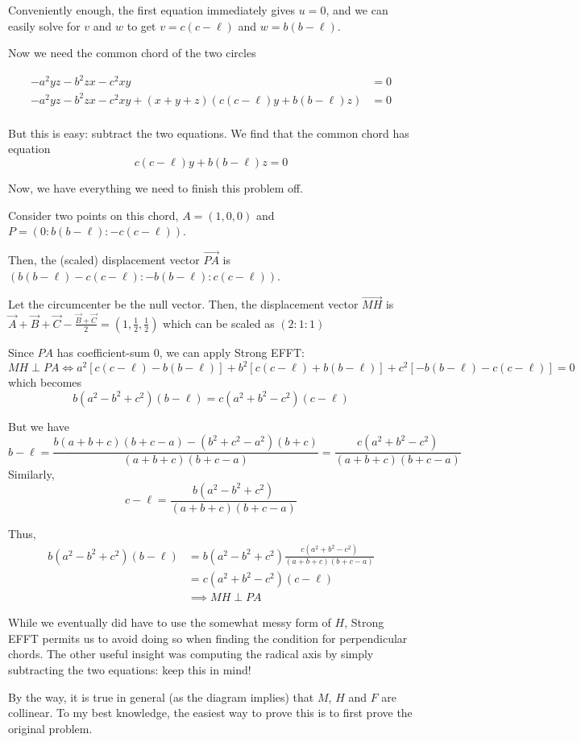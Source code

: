 \begin{soln}
  Conveniently enough, the first equation immediately gives $u=0$, and we can easily solve for $v$ and $w$ to get $v = c(c-\ell)$ and $w=b(b-\ell)$.

  Now we need the common chord of the two circles

  \begin{align*}
     -a^2yz - b^2zx - c^2xy &= 0 \\
     -a^2yz - b^2zx - c^2xy + (x+y+z)(c(c-\ell) y + b(b-\ell) z) &= 0\\
  \end{align*}

  But this is easy: subtract the two equations.  We find that the common chord has equation
  \[ c(c-\ell) y + b(b-\ell) z = 0\]




  Now, we have everything we need to finish this problem off.

  Consider two points on this chord, $A=(1,0,0)$ and $P=(0:b(b-\ell):-c(c-\ell))$.

  Then, the (scaled) displacement vector $\overrightarrow{PA}$ is $(b(b-\ell)-c(c-\ell):-b(b-\ell):c(c-\ell))$.

  Let the circumcenter be the null vector. Then, the displacement vector $\overrightarrow{MH}$ is $\vec A+\vec B + \vec C-\frac{\vec B + \vec C}{2}=\left(1,\frac{1}{2},\frac{1}{2}\right)$ which can be scaled as $(2:1:1)$

  Since $PA$ has coefficient-sum $0$, we can apply Strong EFFT: \[ MH \perp PA \Leftrightarrow a^2[c(c-\ell)-b(b-\ell)]+b^2[c(c-\ell)+b(b-\ell)]+c^2[-b(b-\ell)-c(c-\ell)] =0 \] which becomes  \[ b(a^2-b^2+c^2)(b-\ell)=c(a^2+b^2-c^2)(c-\ell) \]

  But we have \[ b-\ell=\frac{b(a+b+c)(b+c-a)-(b^2+c^2-a^2)(b+c)}{(a+b+c)(b+c-a)}=\frac{c(a^2+b^2-c^2)}{(a+b+c)(b+c-a)}\]  Similarly, \[ c-\ell=\frac{b(a^2-b^2+c^2)}{(a+b+c)(b+c-a)} \]

  Thus,
  \begin{align*}
    b(a^2-b^2+c^2)(b-\ell) &= b(a^2-b^2+c^2)\frac{c(a^2+b^2-c^2)}{(a+b+c)(b+c-a)} \\
    &=c(a^2+b^2-c^2)(c-\ell) \\
    &\implies MH \perp PA
  \end{align*}
\end{soln}

\seccm
While we eventually did have to use the somewhat messy form of $H$, Strong EFFT permits us to avoid doing so when finding the condition for perpendicular chords.  The other useful insight was computing the radical axis by simply subtracting the two equations: keep this in mind!

By the way, it is true in general (as the diagram implies) that $M$, $H$ and $F$ are collinear.  To my best knowledge, the easiest way to prove this is to first prove the original problem.

